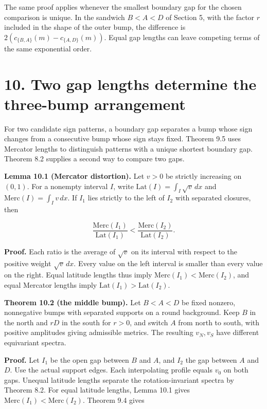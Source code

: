 \documentclass[11pt,letterpaper]{article}
\begin{document}
The same proof applies whenever the smallest boundary gap for the chosen comparison is
unique. In the sandwich \(B<A<D\) of Section 5, with the factor \(r\) included in the shape
of the outer bump, the difference is \(2(c_{\{B,A\}}(m)-c_{\{A,D\}}(m))\). Equal gap lengths
can leave competing terms of the same exponential order.

\section{10. Two gap lengths determine the three-bump
arrangement}\label{two-gap-lengths-determine-the-three-bump-arrangement}

For two candidate sign patterns, a boundary gap separates a bump whose sign changes from a
consecutive bump whose sign stays fixed. Theorem 9.5 uses Mercator lengths to distinguish
patterns with a unique shortest boundary gap. Theorem 8.2 supplies a second way to compare
two gaps.

\textbf{Lemma 10.1 (Mercator distortion).} Let \(v>0\) be strictly increasing on \((0,1)\).
For a nonempty interval \(I\), write \(\mathrm{Lat}(I)=\int_I\sqrt v\,dx\) and
\(\mathrm{Merc}(I)=\int_I v\,dx\). If \(I_1\) lies strictly to the left of \(I_2\) with
separated closures, then

\[\frac{\mathrm{Merc}(I_1)}{\mathrm{Lat}(I_1)}<\frac{\mathrm{Merc}(I_2)}{\mathrm{Lat}(I_2)}.\]

\textbf{Proof.} Each ratio is the average of \(\sqrt v\) on its interval with respect to the
positive weight \(\sqrt v\,dx\). Every value on the left interval is smaller than every
value on the right. Equal latitude lengths thus imply
\(\mathrm{Merc}(I_1)<\mathrm{Merc}(I_2)\), and equal Mercator lengths imply
\(\mathrm{Lat}(I_1)>\mathrm{Lat}(I_2)\).

\textbf{Theorem 10.2 (the middle bump).} Let \(B<A<D\) be fixed nonzero, nonnegative bumps
with separated supports on a round background. Keep \(B\) in the north and \(rD\) in the
south for \(r>0\), and switch \(A\) from north to south, with positive amplitudes giving
admissible metrics. The resulting \(v_N,v_S\) have different equivariant spectra.

\textbf{Proof.} Let \(I_1\) be the open gap between \(B\) and \(A\), and \(I_2\) the gap
between \(A\) and \(D\). Use the actual support edges. Each interpolating profile equals
\(v_0\) on both gaps. Unequal latitude lengths separate the rotation-invariant spectra by
Theorem 8.2. For equal latitude lengths, Lemma 10.1 gives
\(\mathrm{Merc}(I_1)<\mathrm{Merc}(I_2)\). Theorem 9.4 gives
\end{document}

